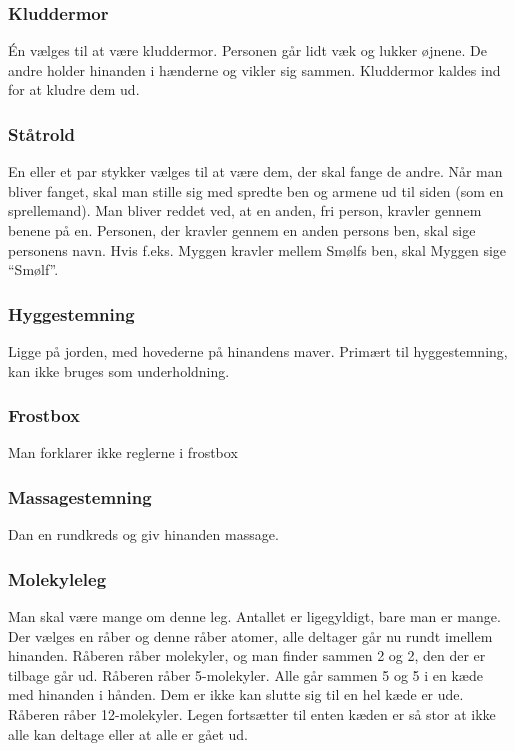 \documentclass[../../../main.tex]{subfiles}
\begin{document}
\begin{multicols}{2}
\subsubsection*{Kluddermor}
Én vælges til at være kluddermor. Personen går lidt væk og lukker øjnene. De andre holder hinanden i hænderne og vikler sig sammen. Kluddermor kaldes ind for at kludre dem ud.

\subsubsection*{Ståtrold}
En eller et par stykker vælges til at være dem, der skal fange de andre. Når man bliver fanget, skal man stille sig med spredte ben og armene ud til siden (som en sprellemand). Man bliver reddet ved, at en anden, fri person, kravler gennem benene på en. Personen, der kravler gennem en anden persons ben, skal sige personens navn. Hvis f.eks. Myggen kravler mellem Smølfs ben, skal Myggen sige “Smølf”.

\subsubsection*{Hyggestemning}
Ligge på jorden, med hovederne på hinandens maver. Primært til hyggestemning, kan ikke bruges som underholdning.

\subsubsection*{Frostbox}
Man forklarer ikke reglerne i frostbox


\subsubsection*{Massagestemning}
Dan en rundkreds og giv hinanden massage.


\subsubsection*{Molekyleleg}
Man skal være mange om denne leg. Antallet er ligegyldigt, bare man er mange. Der vælges en råber og denne råber atomer, alle deltager går nu rundt imellem hinanden. Råberen råber molekyler, og man finder sammen 2 og 2, den der er tilbage går ud. Råberen råber 5-molekyler. Alle går sammen 5 og 5 i en kæde med hinanden i hånden. Dem er ikke kan slutte sig til en hel kæde er ude. Råberen råber 12-molekyler. Legen fortsætter til enten kæden er så stor at ikke alle kan deltage eller at alle er gået ud. 
    

\end{multicols}
\end{document}

